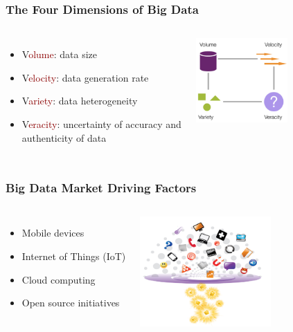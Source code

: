 \documentclass{beamer}
\begin{document}
\begin{frame}
\frametitle{The Four Dimensions of Big Data}
\begin{columns}[c] 
\begin{itemize}\itemsep1em
  \justifying
  \item \textcolor{Ocean}V\textcolor{darkred}{olume}: data \textcolor{TextGreen}{size}
  \item \textcolor{Ocean}V\textcolor{darkred}{elocity}: data \textcolor{TextGreen}{generation rate}
  \item \textcolor{Ocean}V\textcolor{darkred}{ariety}: data \textcolor{TextGreen}{heterogeneity}
  \item \textcolor{Ocean}V\textcolor{darkred}{eracity}: \textcolor{TextGreen}{uncertainty} of accuracy and \\ authenticity of data
\end{itemize}

\includegraphics[width=3.5cm]{figs/vs.pdf}
\end{columns}
\end{frame}

\begin{frame}
\frametitle{Big Data Market Driving Factors}
\begin{columns}[c] 
\begin{itemize}\itemsep2em
  \justifying
  \item Mobile devices
  \item Internet of Things (IoT)
  \item Cloud computing
  \item Open source initiatives
\end{itemize}
\includegraphics[width=5cm]{figs/driving_factors.pdf}
\end{columns}
\end{frame}
\end{document}
